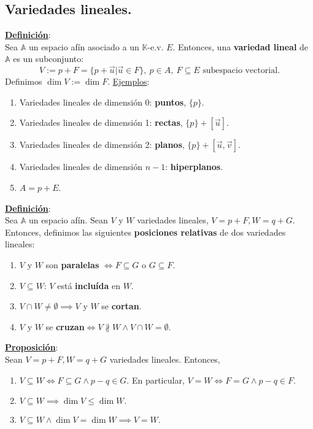 \documentclass[11pt]{article}
\newcommand{\kev}{$\mathbb{K}$-e.v. }
\newcommand{\af}{\mathbb{A}}
\newcommand{\defi}{\underline{\textbf{Definición}}:\\}
\newcommand{\prop}{\underline{\textbf{Proposición}}:\\}
\newcommand{\ej}{\underline{Ejemplos}:\\}
\begin{document}
\subsection{Variedades lineales.}
\defi Sea $\af$ un espacio afín asociado a un \kev $E$. Entonces, una \textbf{variedad lineal} de $\af$ es un subconjunto:
$$
V:=p+F=\{p+\vec{u}\vert\vec{u}\in F\},\ p\in A,\ F\subseteq E\textrm{ subespacio vectorial.}
$$
Definimos $\dim V:=\dim F$.\newpage
\ej
\begin{enumerate}
	\item Variedades lineales de dimensión 0: \textbf{puntos}, $\{p\}$.
	\item Variedades lineales de dimensión 1: \textbf{rectas}, $\{p\}+[\vec{u}]$.
	\item Variedades lineales de dimensión 2: \textbf{planos}, $\{p\}+[\vec{u},\vec{v}]$.
	\item Variedades lineales de dimensión $n-1$: \textbf{hiperplanos}.
	\item $A=p+E$.
\end{enumerate}
\defi Sea $\af$ un espacio afín. Sean $V$ y $W$ variedades lineales, $V=p+F,W=q+G$. Entonces, definimos las siguientes \textbf{posiciones relativas} de dos variedades lineales:
\begin{enumerate}
	\item $V$ y $W$ son \textbf{paralelas} $\iff F\subseteq G$ o $G\subseteq F$.
	\item $V\subseteq W$: $V$ está \textbf{incluída} en $W$.
	\item $V\cap W\neq\emptyset\implies V$ y $W$ se \textbf{cortan}.
	\item $V$ y $W$ se \textbf{cruzan}$\iff V\nparallel W\wedge V\cap W=\emptyset$.
\end{enumerate}
\prop Sean $V=p+F,W=q+G$ variedades lineales. Entonces,
\begin{enumerate}
	\item $V\subseteq W\iff F\subseteq G\wedge p-q\in G$. En particular, $V=W\iff F=G\wedge p-q\in F$.
	\item $V\subseteq W\implies\dim V\leq\dim W.$
	\item $V\subseteq W\wedge\dim V=\dim W\implies V=W.$
\end{enumerate}
\end{document}
